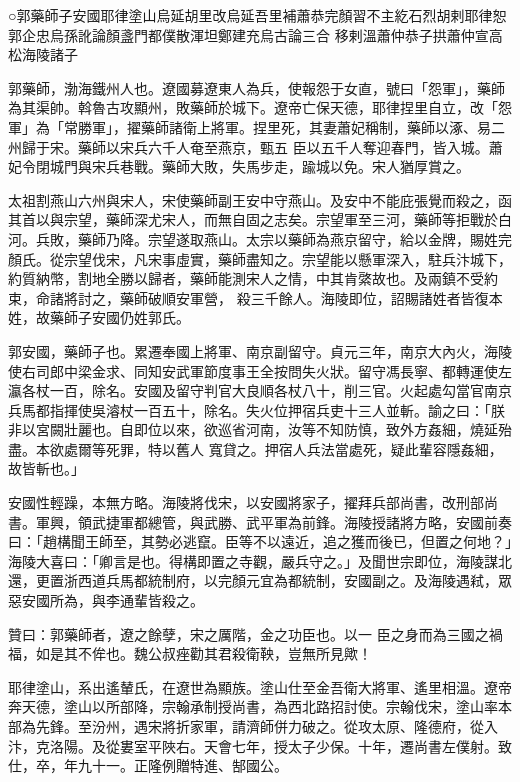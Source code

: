 
\begin{pinyinscope}

 ○郭藥師子安國耶律塗山烏延胡里改烏延吾里補蕭恭完顏習不主紇石烈胡剌耶律恕郭企忠烏孫訛論顏盞門都僕散渾坦鄭建充烏古論三合
 移剌溫蕭仲恭子拱蕭仲宣高松海陵諸子



 郭藥師，渤海鐵州人也。遼國募遼東人為兵，使報怨于女直，號曰「怨軍」，藥師為其渠帥。斡魯古攻顯州，敗藥師於城下。遼帝亡保天德，耶律捏里自立，改「怨軍」為「常勝軍」，擢藥師諸衛上將軍。捏里死，其妻蕭妃稱制，藥師以涿、易二州歸于宋。藥師以宋兵六千人奄至燕京，甄五
 臣以五千人奪迎春門，皆入城。蕭妃令閉城門與宋兵巷戰。藥師大敗，失馬步走，踰城以免。宋人猶厚賞之。



 太祖割燕山六州與宋人，宋使藥師副王安中守燕山。及安中不能庇張覺而殺之，函其首以與宗望，藥師深尤宋人，而無自固之志矣。宗望軍至三河，藥師等拒戰於白河。兵敗，藥師乃降。宗望遂取燕山。太宗以藥師為燕京留守，給以金牌，賜姓完顏氏。從宗望伐宋，凡宋事虛實，藥師盡知之。宗望能以懸軍深入，駐兵汴城下，約質納幣，割地全勝以歸者，藥師能測宋人之情，中其肯綮故也。及兩鎮不受約束，命諸將討之，藥師破順安軍營，
 殺三千餘人。海陵即位，詔賜諸姓者皆復本姓，故藥師子安國仍姓郭氏。



 郭安國，藥師子也。累遷奉國上將軍、南京副留守。貞元三年，南京大內火，海陵使右司郎中梁金求、同知安武軍節度事王全按問失火狀。留守馮長寧、都轉運使左瀛各杖一百，除名。安國及留守判官大良順各杖八十，削三官。火起處勾當官南京兵馬都指揮使吳濬杖一百五十，除名。失火位押宿兵吏十三人並斬。諭之曰：「朕非以宮闕壯麗也。自即位以來，欲巡省河南，汝等不知防慎，致外方姦細，燒延殆盡。本欲處爾等死罪，特以舊人
 寬貸之。押宿人兵法當處死，疑此輩容隱姦細，故皆斬也。」



 安國性輕躁，本無方略。海陵將伐宋，以安國將家子，擢拜兵部尚書，改刑部尚書。軍興，領武捷軍都總管，與武勝、武平軍為前鋒。海陵授諸將方略，安國前奏曰：「趙構聞王師至，其勢必逃竄。臣等不以遠近，追之獲而後已，但置之何地？」海陵大喜曰：「卿言是也。得構即置之寺觀，嚴兵守之。」及聞世宗即位，海陵謀北還，更置浙西道兵馬都統制府，以完顏元宜為都統制，安國副之。及海陵遇弒，眾惡安國所為，與李通輩皆殺之。



 贊曰：郭藥師者，遼之餘孽，宋之厲階，金之功臣也。以一
 臣之身而為三國之禍福，如是其不侔也。魏公叔痤勸其君殺衛鞅，豈無所見歟！



 耶律塗山，系出遙輦氏，在遼世為顯族。塗山仕至金吾衛大將軍、遙里相溫。遼帝奔天德，塗山以所部降，宗翰承制授尚書，為西北路招討使。宗翰伐宋，塗山率本部為先鋒。至汾州，遇宋將折家軍，請濟師併力破之。從攻太原、隆德府，從入汴，克洛陽。及從婁室平陜右。天會七年，授太子少保。十年，遷尚書左僕射。致仕，卒，年九十一。正隆例贈特進、郜國公。




\end{pinyinscope}
